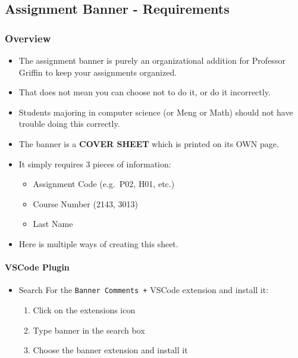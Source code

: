 \hypertarget{assignment-banner---requirements}{%
\subsection{Assignment Banner -
Requirements}\label{assignment-banner---requirements}}

\hypertarget{overview}{%
\subsubsection{Overview}\label{overview}}

\begin{itemize}
\tightlist
\item
  The assignment banner is purely an organizational addition for
  Professor Griffin to keep your assignments organized.
\item
  That does not mean you can choose not to do it, or do it incorrectly.
\item
  Students majoring in computer science (or Meng or Math) should not
  have trouble doing this correctly.
\item
  The banner is a \textbf{COVER SHEET} which is printed on its OWN page.
\item
  It simply requires 3 pieces of information:

  \begin{itemize}
  \tightlist
  \item
    Assignment Code (e.g.~P02, H01, etc.)
  \item
    Course Number (2143, 3013)
  \item
    Last Name
  \end{itemize}
\item
  Here is multiple ways of creating this sheet.
\end{itemize}

\hypertarget{vscode-plugin}{%
\paragraph{VSCode Plugin}\label{vscode-plugin}}

\begin{itemize}
\tightlist
\item
  Search For the \texttt{Banner\ Comments\ +} VSCode extension and
  install it:

  \begin{enumerate}
  \def\labelenumi{\arabic{enumi}.}
  \tightlist
  \item
    Click on the extensions icon
  \item
    Type banner in the search box
  \item
    Choose the banner extension and install it
  \end{enumerate}
\end{itemize}

